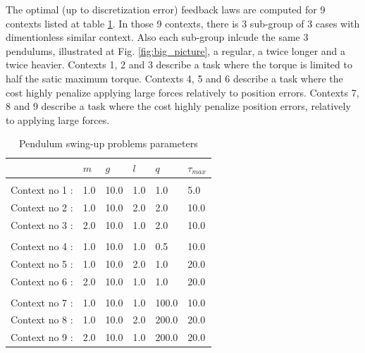 The optimal (up to discretization error) feedback laws are computed for 9 contexts listed at table \ref{tb:9contexts}. In those 9 contexts, there is 3 sub-group of 3 cases with dimentionless similar context. Also each sub-group inlcude the same 3 pendulums, illustrated at Fig. \ref{fig:big_picture}, a regular, a twice longer and a twice heavier. Contexts 1, 2 and 3 describe a task where the torque is limited to half the satic maximum torque.  Contexts 4, 5 and 6 describe a task where the cost highly penalize applying large forces relatively to position errors. Contexts 7, 8 and 9 describe a task where the cost highly penalize position errors, relatively to applying large forces. 
\begin{table}[htb]
   \centering %
   \caption{Pendulum swing-up problems parameters} 
   \label{tb:9contexts}
   \begin{tabular}{ p{2.0cm} p{0.8cm} p{0.8cm} p{0.8cm} p{0.8cm} p{0.8cm} }
   \hline \hline \noalign{\smallskip} \noalign{\smallskip} 
      & $m$ & $g$ & $l$ & $q$ & $\tau_{max}$ \\ \hline
   \hline \hline \noalign{\smallskip} 
   \multicolumn{6}{c}{\textbf{Problems with $\tau_{max}^* = 0.5$ and $q^* = 0.1$} }\\ \noalign{\smallskip}  \hline\hline  \noalign{\smallskip} 
   Context no 1 : & 1.0 & 10.0 & 1.0 & 1.0 & 5.0 \\
   Context no 2 : & 1.0 & 10.0 & 2.0 & 2.0 & 10.0 \\
   Context no 3 : & 2.0 & 10.0 & 1.0 & 2.0 & 10.0 \\
   \hline \hline \noalign{\smallskip} 
   \multicolumn{6}{c}{\textbf{Problems with $\tau_{max}^* = 1.0$ and $q^* = 0.05$} }\\ \noalign{\smallskip}  \hline\hline  \noalign{\smallskip} 
   Context no 4 : & 1.0 & 10.0 & 1.0 & 0.5 & 10.0 \\
   Context no 5 : & 1.0 & 10.0 & 2.0 & 1.0 & 20.0 \\
   Context no 6 : & 2.0 & 10.0 & 1.0 & 1.0 & 20.0 \\
   \hline \hline \noalign{\smallskip} 
   \multicolumn{6}{c}{\textbf{Problems with $\tau_{max}^* = 1.0$ and $q^* = 10$} }\\ \noalign{\smallskip}  \hline\hline  \noalign{\smallskip} 
   Context no 7 : & 1.0 & 10.0 & 1.0 & 100.0 & 10.0 \\
   Context no 8 : & 1.0 & 10.0 & 2.0 & 200.0 & 20.0 \\
   Context no 9 : & 2.0 & 10.0 & 1.0 & 200.0 & 20.0 \\
   \hline \hline
   \end{tabular}
\end{table}

